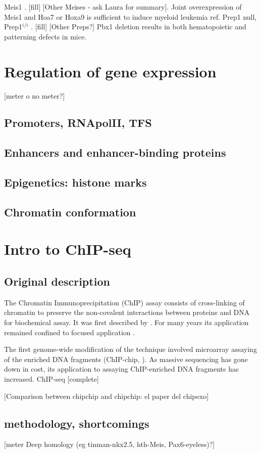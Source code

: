 		Meis1  \cite{Azcoitia2005, Carramolino2010}. [fill] [Other Meises - ask Laura for summary]. Joint overexpression of Meis1 and Hoa7 or Hoxa9 is sufficient to induce myeloid leukemia {ref}.
		Prep1 null, Prep1$^{i/i}$ \cite{Ferretti2006, Fernandez-Diaz2010, Longobardi2010}. [fill] [Other Preps?]
		Pbx1 deletion results in both hematopoietic \cite{DiMartino2001} and patterning \cite{Selleri et al. 2001} defects in mice.

\section{Regulation of gene expression}
[meter o no meter?]
\subsection{Promoters, RNApolII, TFS}

\subsection{Enhancers and enhancer-binding proteins}

\subsection{Epigenetics: histone marks}

\subsection{Chromatin conformation}

\section{Intro to ChIP-seq}

\subsection{Original description}
The Chromatin Immunoprecipitation (ChIP) assay consists of cross-linking of chromatin to preserve the non-covalent interactions between proteins and DNA for biochemical assay. It was first described by \cite{Solomon1988}. For many years its application remained confined to focused application \cite{Mardis2007}.  

The first genome-wide modification of the technique involved microarray assaying of the enriched DNA fragments (ChIP-chip, \cite{Ren2000}). As massive sequencing has gone down in cost, its application to assaying ChIP-enriched DNA fragments has increased. ChIP-seq \cite{Robertson2007} [complete]

[Comparison between chipchip and chipchip: el paper del chipexo]

\subsection{methodology, shortcomings}




[meter Deep homology (eg tinman-nkx2.5, hth-Meis, Pax6-eyeless)?]
